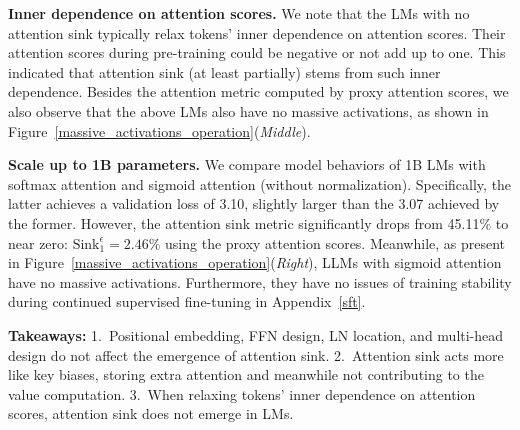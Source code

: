 \textbf{Inner dependence on attention scores.} We note that the LMs with no attention sink typically relax tokens' inner dependence on attention scores. Their attention scores during pre-training could be negative or not add up to one. This indicated that attention sink (at least partially) stems from such inner dependence. Besides the attention metric computed by proxy attention scores, we also observe that the above LMs also have no massive activations, as shown in Figure~\ref{massive_activations_operation}(\emph{Middle}). 

\textbf{Scale up to 1B parameters.} We compare model behaviors of 1B LMs with softmax attention and sigmoid attention (without normalization). Specifically, the latter achieves a validation loss of 3.10, slightly larger than the 3.07 achieved by the former. However, the attention sink metric significantly drops from 45.11\% to near zero: $\textrm{Sink}_1^{\epsilon}=\textrm{2.46\%}$ using the proxy attention scores. Meanwhile, as present in Figure~\ref{massive_activations_operation}(\emph{Right}), LLMs with sigmoid attention have no massive activations. Furthermore, they have no issues of training stability during continued supervised fine-tuning in Appendix~\ref{sft}.


\begin{abox} %
     \textbf{Takeaways:} 1.~Positional embedding, FFN design, LN location, and multi-head design do not affect the emergence of attention sink. 2.~Attention sink acts more like key biases, storing extra attention and meanwhile not contributing to the value computation. 3.~When relaxing tokens' inner dependence on attention scores, attention sink does not emerge in LMs. %
\end{abox}






